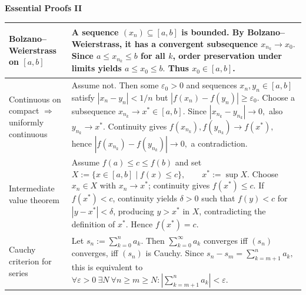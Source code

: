{\scriptsize
\renewcommand{\arraystretch}{1}
\setlength{\tabcolsep}{2pt}

\noindent
\begin{minipage}[t]{0.495\textwidth}
\vspace{0pt}

\textbf{\large Essential Proofs II}\par
\vspace{2pt}

\begin{tabular}{
    @{}
    >{\bfseries\raggedright\arraybackslash}p{2.9cm}
    >{\raggedright\arraybackslash}p{10.5cm}
    @{}
}
\toprule


Bolzano--Weierstrass on $[a,b]$ &
A sequence $(x_n)\subseteq[a,b]$ is bounded. By Bolzano--Weierstrass,
it has a convergent subsequence
$
x_{n_k}\to x_0.
$
Since
$
a\le x_{n_k}\le b
$
for all $k$, order preservation under limits yields
$
a\le x_0\le b.
$
Thus $x_0\in[a,b]$.
\\

\midrule

Continuous on compact $\Rightarrow$ uniformly continuous &
Assume not. Then some $\varepsilon_0>0$ and sequences
$x_n,y_n\in[a,b]$ satisfy
$
|x_n-y_n|<1/n
$
but
$
|f(x_n)-f(y_n)|\ge\varepsilon_0.
$
Choose a subsequence $x_{n_k}\to x^*\in[a,b]$. Since
$
|x_{n_k}-y_{n_k}|\to0,
$
also $y_{n_k}\to x^*$. Continuity gives
$
f(x_{n_k}),f(y_{n_k})\to f(x^*),
$
hence
$
|f(x_{n_k})-f(y_{n_k})|\to0,
$
a contradiction.
\\

\midrule

Intermediate value theorem &
Assume $f(a)\le c\le f(b)$ and set
$
X:=\{x\in[a,b]\mid f(x)\le c\},
\qquad
x^*:=\sup X.
$
Choose $x_n\in X$ with $x_n\to x^*$; continuity gives
$
f(x^*)\le c.
$
If $f(x^*)<c$, continuity yields $\delta>0$ such that
$
f(y)<c
$
for $|y-x^*|<\delta$, producing $y>x^*$ in $X$, contradicting the
definition of $x^*$. Hence
$
f(x^*)=c.
$
\\

\midrule

Cauchy criterion for series &
Let
$
s_n:=\sum_{k=0}^{n}a_k.
$
Then
$
\sum_{k=0}^{\infty}a_k
$
converges iff $(s_n)$ converges, iff $(s_n)$ is Cauchy. Since
$
s_n-s_m=\sum_{k=m+1}^{n}a_k,
$
this is equivalent to
$
\forall\varepsilon>0\ \exists N\
\forall n\ge m\ge N:
\left|\sum_{k=m+1}^{n}a_k\right|<\varepsilon.
$
\\


\end{tabular}
\end{minipage}}
